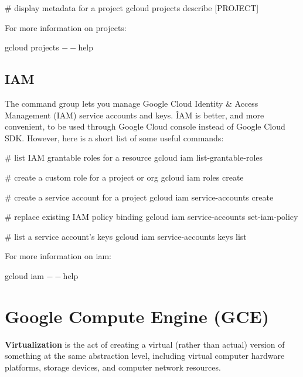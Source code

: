 \begin{bash}
# display metadata for a project
gcloud projects describe [PROJECT]
\end{bash}

For more information on projects:
\begin{bash}
gcloud projects $--$help
\end{bash}

\subsection{IAM}

The  command group lets you manage Google Cloud Identity \& Access Management (IAM) service accounts
and keys. \v

IAM is better, and more convenient, to be used through Google Cloud console instead of Google Cloud SDK. However, here
is a short list of some useful commands:
\begin{bash}
# list IAM grantable roles for a resource
gcloud iam list-grantable-roles
\end{bash}

\begin{bash}
# create a custom role for a project or org
gcloud iam roles create
\end{bash}

\begin{bash}
# create a service account for a project
gcloud iam service-accounts create
\end{bash}

\begin{bash}
# replace existing IAM policy binding
gcloud iam service-accounts set-iam-policy
\end{bash}

\begin{bash}
# list a service account's keys
gcloud iam service-accounts keys list
\end{bash}

For more information on iam:
\begin{bash}
gcloud iam $--$help
\end{bash}

\section{Google Compute Engine (GCE)}

\bd[Virtualization]
\textbf{Virtualization} is the act of creating a virtual (rather than actual) version of something at the same
abstraction level, including virtual computer hardware platforms, storage devices, and computer network resources.
\ed

